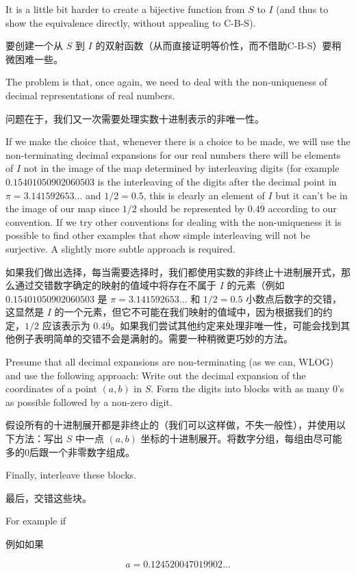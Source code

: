 It is a little bit harder to create a bijective function from $S$ to $I$
(and thus
to show the equivalence directly, without appealing to C-B-S).

要创建一个从 $S$ 到 $I$ 的双射函数（从而直接证明等价性，而不借助C-B-S）要稍微困难一些。

The problem
is that, once again, we need to deal with the non-uniqueness of decimal
representations of real numbers.

问题在于，我们又一次需要处理实数十进制表示的非唯一性。

If we make the choice that, whenever there
is a choice to be made, we will use the non-terminating decimal expansions
for our real numbers there will be elements of $I$ not in the image of the map
determined by interleaving digits (for example $0.15401050902060503$ is the
interleaving of the digits after the decimal point in
$\pi = 3.141592653\ldots$ and $1/2 = 0.5$, this is clearly an element of
$I$ but it can't be in the image of our
map since $1/2$ should be represented by $0.4\overline{9}$ according to
our convention.   If
we try other conventions for dealing with the non-uniqueness it is possible
to
find other examples that show simple interleaving will not be surjective.
A slightly more subtle approach is required.

如果我们做出选择，每当需要选择时，我们都使用实数的非终止十进制展开式，那么通过交错数字确定的映射的值域中将存在不属于 $I$ 的元素（例如 $0.15401050902060503$ 是 $\pi = 3.141592653\ldots$ 和 $1/2 = 0.5$ 小数点后数字的交错，这显然是 $I$ 的一个元素，但它不可能在我们映射的值域中，因为根据我们的约定，$1/2$ 应该表示为 $0.4\overline{9}$。如果我们尝试其他约定来处理非唯一性，可能会找到其他例子表明简单的交错不会是满射的。需要一种稍微更巧妙的方法。

Presume that all decimal expansions are non-terminating (as we can,
WLOG) and use the following approach:
Write out the decimal expansion of the coordinates of a point $(a, b)$ in
$S$.  Form the digits into blocks with as many 0's as possible followed by a
non-zero digit.

假设所有的十进制展开都是非终止的（我们可以这样做，不失一般性），并使用以下方法：写出 $S$ 中一点 $(a, b)$ 坐标的十进制展开。将数字分组，每组由尽可能多的0后跟一个非零数字组成。

Finally, interleave these blocks.

最后，交错这些块。

For example if

例如如果

\[ a = 0.124520047019902 \ldots \]

